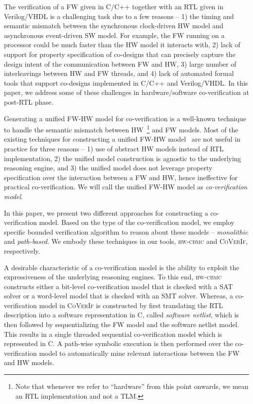 \documentclass[sigconf]{acmart}
\newcommand{\tool}[1]{\textsc{#1}\xspace}
\newcommand{\hwcbmcv}{\tool{hw-cbmc}}
\newcommand{\verifox}{\tool{CoVerIf}}
\begin{document}
The verification of a FW given in C/C++ together with an RTL given in 
Verilog/VHDL is a challenging task due to a
few reasons -- 1) the timing and semantic mismatch between the synchronous
clock-driven HW model and asynchronous event-driven SW model. For example, the
FW running on a processor could be much faster than the HW
model it interacts with, 2) lack of support for property specification of 
co-designs that can precisely capture the design intent of the 
communication between FW and HW, 3) large
number of interleavings between HW and FW threads, and 4) lack 
of automated formal tools that support co-designs implemented in C/C++ and 
Verilog/VHDL.   In this paper, we address some of these challenges in 
hardware/software co-verification at post-RTL phase. 


Generating a unified FW-HW model for co-verification is a 
well-known technique to handle the semantic mismatch between  
HW~\footnote{Note that whenever we refer to ``hardware'' 
from this point onwards, we mean an RTL implementation 
and not a TLM.}  and FW models.  Most of the existing techniques 
for constructing a unified FW-HW model~\cite{fmsd02,emsoft07,fase10} 
are not useful in practice for three reasons -- 1) use of abstract HW models 
instead of RTL implementation, 2) the unified model
construction is agnostic to the underlying reasoning engine, and 3) 
the unified model does not leverage property specification over the
interaction between a FW and HW, hence ineffective for practical co-verification.  
We will call the unified FW-HW model as \emph{co-verification model}. 

In this paper, we present two different approaches for constructing a
co-verification model.  Based on the type of the co-verification model, 
we employ specific bounded verification algorithm to reason about these models
-- \emph{monolithic} and \emph{path-based}.  We embody these techniques 
in our tools, \hwcbmcv and \verifox, respectively. 


A desirable characteristic of a co-verification model is the ability to exploit 
the expressiveness of the underlying reasoning engines.  To this end, \hwcbmcv
constructs either a bit-level co-verification model that is checked with a SAT solver 
or a word-level model that is checked with an SMT solver.  Whereas, a 
co-verification model in \verifox is constructed 
by first translating the RTL description into a software representation in C,
called \emph{software netlist}, which is then followed by sequentializing the FW 
model and the software netlist model.  This results in a single
threaded sequential co-verification model which is represented in C. A path-wise 
symbolic execution is then performed over the co-verification model to
automatically mine relevant interactions between the FW and HW models.   
\end{document}
